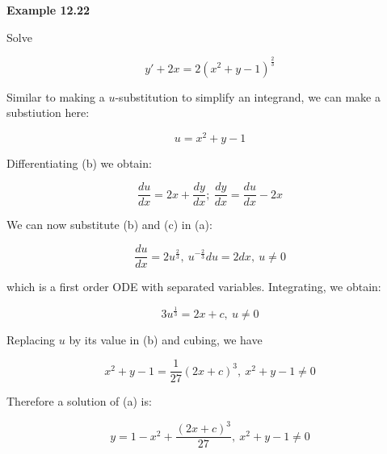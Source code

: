\documentclass{article}
\begin{document}
\textbf{Example 12.22}

Solve

\[ \tag{a} y' + 2x = 2(x^2 + y - 1)^{\frac{2}{3}} \]

Similar to making a $u$-substitution to simplify an integrand, we can make a substiution here:

\[ \tag{b} u = x^2 + y - 1 \]

Differentiating (b) we obtain:

\[ \tag{c} \frac{du}{dx} = 2x + \frac{dy}{dx}; ~ \frac{dy}{dx} = \frac{du}{dx} - 2x \]

We can now substitute (b) and (c) in (a):

\[ \tag{d} \frac{du}{dx} = 2u^{\frac{2}{3}}, ~ u^{-\frac{2}{3}}du = 2dx, ~ u \neq 0 \]

which is a first order ODE with separated variables. Integrating, we obtain:

\[ \tag{e} 3u^{\frac{1}{3}} = 2x + c, ~ u \neq 0 \]

Replacing $u$ by its value in (b) and cubing, we have

\[ \tag{f} x^2 + y - 1 = \frac{1}{27}(2x+c)^3, ~ x^2 + y - 1 \neq 0 \]

Therefore a solution of (a) is:

\[ \tag{g} y = 1 - x^2 + \frac{(2x+c)^3}{27}, ~ x^2 + y - 1 \neq 0 \]
\end{document}

